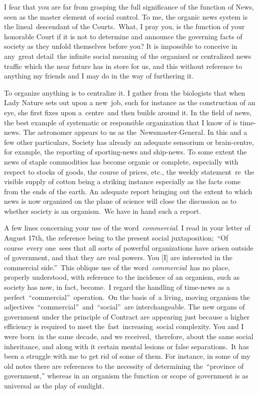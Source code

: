 \documentclass[openany,nobib]{tufte-book}
\begin{document}
I fear that you are far from grasping the full significance of the
function of News, seen as the master element of social control. To me,
the organic news system is the lineal~descendant of the Courts.~What, I
pray you, is the function of your honorable Court if it is not to
determine and announce the governing facts of society as they unfold
themselves before you? It is impossible to conceive in any~great
detail~the infinite social meaning of the organized or centralized news
traffic which the near future has in store for us, and this without
reference to anything my friends and I may do in the way of furthering
it.~

To organize anything is to centralize it. I gather from the biologists
that when Lady Nature sets out upon a new~job, such for instance as the
construction of an eye, she first fixes upon a~centre~and then builds
around it. In the field of news, the best example of systematic or
responsible organization that I know of is time-news. The astronomer
appears to us as the~Newsmaster-General. In this and a few other
particulars, Society has already an adequate sensorium or brain-centre,
for example, the reporting of sporting-news and ship-news. To some
extent the news of staple commodities has become organic or complete,
especially with respect to stocks of goods, the course of prices, etc.,
the weekly statement~re~the visible supply of cotton being a striking
instance especially as the facts come from the ends of the earth. An
adequate report bringing out the extent to which news is now organized
on the plane of science will close the discussion as to whether society
is an organism.~We have in hand such a report.~

A few lines concerning your use of the word~\emph{commercial}. I read in
your letter of August 17th, the reference being to the present social
juxtaposition;~``Of course~every one~sees that all sorts of powerful
organizations have arisen outside of government, and that they are real
powers. You {[}I{]} are interested in the commercial side.''~This
oblique use of the word~\emph{commercial}~has no place, properly
understood, with reference to the incidence of an organism, such as
society has now, in fact, become.~I regard the handling of time-news as
a perfect~``commercial''~operation.~On the basis of~a living, moving
organism the adjectives~``commercial''~and~``social''~are
interchangeable. The new organs of government under the principle of
Contract are appearing just because a higher efficiency is required to
meet the~fast~increasing~social complexity. You and I were born~in the
same decade, and we received,~therefore, about the same social
inheritance, and along with it certain mental lesions or false
separations.~It has been a struggle with me to get rid of some of them.
For instance, in some of my old notes there are references to the
necessity of determining the~``province of government,'' whereas in an
organism the function or scope of government is as universal as the play
of sunlight.~
\end{document}
